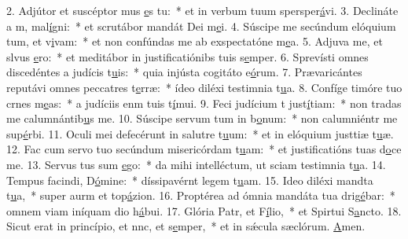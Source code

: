 2. Adjútor et suscéptor mus \uline{e}s tu:~* et in verbum tuum spersper\uline{á}vi.
3. Declináte a m, mal\uline{í}gni:~* et scrutábor mandát Dei m\uline{e}i.
4. Súscipe me secúndum elóquium tum, et v\uline{i}vam:~* et non confúndas me ab exspectatóne m\uline{e}a.
5. Adjuva me, et slvus \uline{e}ro:~* et meditábor in justificatiónibs tuis s\uline{e}mper.
6. Sprevísti omnes discedéntes a judícis t\uline{u}is:~* quia injústa cogitáto e\uline{ó}rum.
7. Prævaricántes reputávi omnes peccatres t\uline{e}rræ:~* ídeo diléxi testimnia t\uline{u}a.
8. Confíge timóre tuo crnes m\uline{e}as:~* a judíciis enm tuis t\uline{í}mui.
9. Feci judícium t just\uline{í}tiam:~* non tradas me calumnántib\uline{u}s me.
10. Súscipe servum tum in b\uline{o}num:~* non calumniéntr me sup\uline{é}rbi.
11. Oculi mei defecérunt in salutre t\uline{u}um:~* et in elóquium justtiæ t\uline{u}æ.
12. Fac cum servo tuo secúndum misericórdam t\uline{u}am:~* et justificatións tuas d\uline{o}ce me.
13. Servus tus sum \uline{e}go:~* da mihi intelléctum, ut sciam testimnia t\uline{u}a.
14. Tempus facindi, D\uline{ó}mine:~* díssipavérnt legem t\uline{u}am.
15. Ideo diléxi mandta t\uline{u}a,~* super aurm et top\uline{á}zion.
16. Proptérea ad ómnia mandáta tua drig\uline{é}bar:~* omnem viam iníquam dio h\uline{á}bui.
17. Glória Patr, et F\uline{í}lio,~* et Spirtui S\uline{a}ncto.
18. Sicut erat in princípio, et nnc, et s\uline{e}mper,~* et in sǽcula sæclórum. \uline{A}men.
